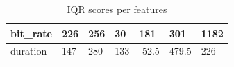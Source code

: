 \begin{table}[!htb]
\begin{tabular}{lllllll}
bit\_rate          & 226         & 256         & 30           & 181                                                               & 301                                                              & 1182                                                                  \\ \hline
duration           & 147         & 280         & 133          & -52.5                                                             & 479.5                                                            & 226                                                                   \\ \hline
\end{tabular}
\caption{IQR scores per features}
\label{IQR scores for features not normalized}
\end{table}

